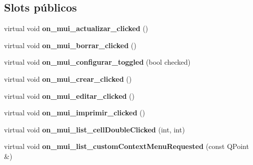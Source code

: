 \subsection*{Slots p\'{u}blicos}
\begin{CompactItemize}
\item 
virtual void {\bf on\_\-mui\_\-actualizar\_\-clicked} ()\label{classPagosList_i0}

\item 
virtual void {\bf on\_\-mui\_\-borrar\_\-clicked} ()\label{classPagosList_i1}

\item 
virtual void {\bf on\_\-mui\_\-configurar\_\-toggled} (bool checked)\label{classPagosList_i2}

\item 
virtual void {\bf on\_\-mui\_\-crear\_\-clicked} ()\label{classPagosList_i3}

\item 
virtual void {\bf on\_\-mui\_\-editar\_\-clicked} ()\label{classPagosList_i4}

\item 
virtual void {\bf on\_\-mui\_\-imprimir\_\-clicked} ()\label{classPagosList_i5}

\item 
virtual void {\bf on\_\-mui\_\-list\_\-cell\-Double\-Clicked} (int, int)\label{classPagosList_i6}

\item 
virtual void {\bf on\_\-mui\_\-list\_\-custom\-Context\-Menu\-Requested} (const QPoint \&)\label{classPagosList_i7}

\end{CompactItemize}
